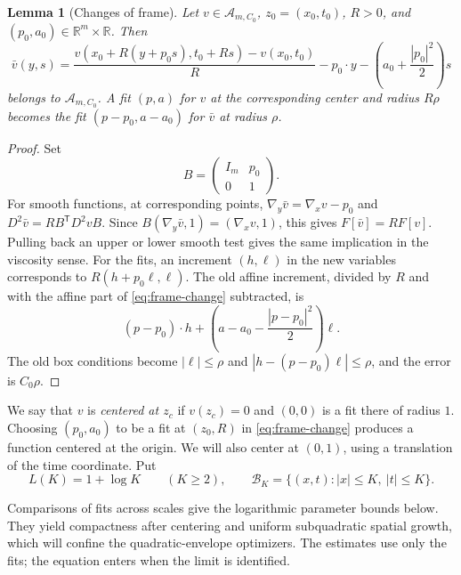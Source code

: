 \documentclass[11pt]{article}
\numberwithin{equation}{section}
\newtheorem{lemma}[theorem]{Lemma}
\theoremstyle{definition}
\theoremstyle{remark}
\newcommand{\R}{\mathbb{R}}
\newcommand{\Aclass}{\mathcal{A}}
\begin{document}
\begin{lemma}[Changes of frame]\label{lem:frame-invariance}
Let $v\in\Aclass_{m,C_0}$, $z_0=(x_0,t_0)$, $R>0$, and
$(p_0,a_0)\in\R^m\times\R$. Then
\begin{equation}\label{eq:frame-change}
  \bar v(y,s)=
  \frac{v(x_0+R(y+p_0s),t_0+Rs)-v(x_0,t_0)}{R}
       -p_0\cdot y-\left(a_0+\frac{|p_0|^2}{2}\right)s
\end{equation}
belongs to $\Aclass_{m,C_0}$. A fit $(p,a)$ for $v$ at the
corresponding center and radius $R\rho$ becomes the fit
$(p-p_0,a-a_0)$ for $\bar v$ at radius $\rho$.
\end{lemma}

\begin{proof}
Set
\[
  B=\begin{pmatrix}I_m&p_0\\0&1\end{pmatrix}.
\]
For smooth functions, at corresponding points,
$\nabla_y\bar v=\nabla_xv-p_0$ and
$D^2\bar v=R B^{\mathsf T}D^2vB$. Since
$B(\nabla_y\bar v,1)=(\nabla_xv,1)$, this gives
$F[\bar v]=R F[v]$. Pulling back an upper or lower smooth test gives
the same implication in the viscosity sense. For the fits, an
increment $(h,\ell)$ in the new variables corresponds to
$R(h+p_0\ell,\ell)$. The old affine increment, divided by $R$ and
with the affine part of \eqref{eq:frame-change} subtracted, is
\[
  (p-p_0)\cdot h+
  \left(a-a_0-\frac{|p-p_0|^2}{2}\right)\ell.
\]
The old box conditions become
$|\ell|\le\rho$ and $|h-(p-p_0)\ell|\le\rho$, and the error is
$C_0\rho$.
\end{proof}

We say that $v$ is \emph{centered at $z_c$} if $v(z_c)=0$ and
$(0,0)$ is a fit there of radius $1$. Choosing $(p_0,a_0)$ to be a
fit at $(z_0,R)$ in \eqref{eq:frame-change} produces a function
centered at the origin. We will also center at $(0,1)$, using a
translation of the time coordinate. Put
\[
  L(K)=1+\log K\qquad(K\ge2),\qquad
  \mathcal B_K=\{(x,t):|x|\le K,\ |t|\le K\}.
\]

Comparisons of fits across scales give the logarithmic parameter bounds
below. They yield compactness after centering and uniform subquadratic
spatial growth, which will confine the quadratic-envelope optimizers.
The estimates use only the fits; the equation enters when the limit is
identified.
\end{document}
